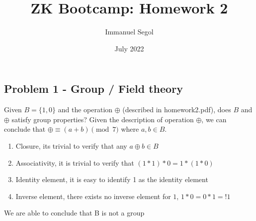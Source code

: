 \documentclass{article}
\title{ZK Bootcamp: Homework 2}
\author{Immanuel Segol}
\date{July 2022}
\begin{document}
\maketitle

\subsection*{Problem 1 - Group / Field theory}
Given $B = \{1,0\}$ and the operation $\oplus$ (described in homework2.pdf), does $B$ and $\oplus$ satisfy group properties?
\newline
\newline
Given the description of operation $\oplus$, we can conclude that  $\oplus \equiv (a + b) \pmod 7$ where $a,b \in B$.

\begin{enumerate}
    \item Closure, its trivial to verify that any $a \oplus b \in B$
    \item Associativity, it is trivial to verify that $(1 * 1) * 0 = 1 * (1 * 0)$
    \item Identity element, it is easy to identify 1 as the identity element
    \item Inverse element, there exists no inverse element for $1$, $1 * 0 = 0 * 1 =! 1$
\end{enumerate}

We are able to conclude that B is not a group
\end{document}

